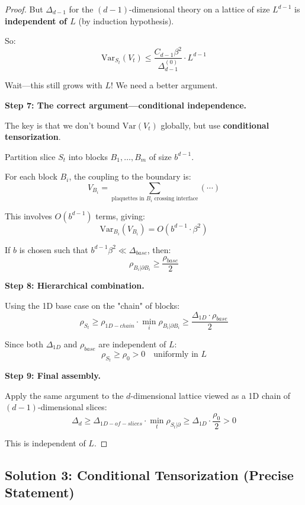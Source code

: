 \begin{proof}
But $\Delta_{d-1}$ for the $(d-1)$-dimensional theory on a lattice of size 
$L^{d-1}$ is \textbf{independent of $L$} (by induction hypothesis).

So:
\[
\mathrm{Var}_{S_t}(V_t) \leq \frac{C_{d-1} \beta^2}{\Delta_{d-1}^{(0)}} \cdot L^{d-1}
\]

Wait—this still grows with $L$! We need a better argument.

\textbf{Step 7: The correct argument—conditional independence.}

The key is that we don't bound $\mathrm{Var}(V_t)$ globally, but use 
\textbf{conditional tensorization}.

Partition slice $S_t$ into blocks $B_1, \ldots, B_m$ of size $b^{d-1}$.

For each block $B_i$, the coupling to the boundary is:
\[
V_{B_i} = \sum_{\text{plaquettes in } B_i \text{ crossing interface}} (\cdots)
\]

This involves $O(b^{d-1})$ terms, giving:
\[
\mathrm{Var}_{B_i}(V_{B_i}) = O(b^{d-1} \cdot \beta^2)
\]

If $b$ is chosen such that $b^{d-1} \beta^2 \ll \Delta_{base}$, then:
\[
\rho_{B_i | \partial B_i} \geq \frac{\rho_{base}}{2}
\]

\textbf{Step 8: Hierarchical combination.}

Using the 1D base case on the "chain" of blocks:
\[
\rho_{S_t} \geq \rho_{1D-chain} \cdot \min_i \rho_{B_i | \partial B_i} \geq \frac{\Delta_{1D} \cdot \rho_{base}}{2}
\]

Since both $\Delta_{1D}$ and $\rho_{base}$ are independent of $L$:
\[
\rho_{S_t} \geq \rho_0 > 0 \quad \text{uniformly in } L
\]

\textbf{Step 9: Final assembly.}

Apply the same argument to the $d$-dimensional lattice viewed as a 1D chain of 
$(d-1)$-dimensional slices:
\[
\Delta_d \geq \Delta_{1D-of-slices} \cdot \min_t \rho_{S_t | \partial} \geq \Delta_{1D} \cdot \frac{\rho_0}{2} > 0
\]

This is independent of $L$.
\end{proof}

\subsection{Solution 3: Conditional Tensorization (Precise Statement)}

